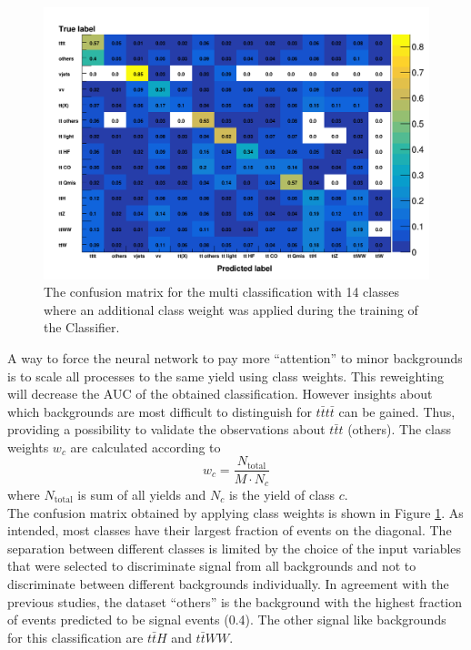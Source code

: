 \begin{figure}[H]
\centering
\includegraphics[width=\linewidth]{figs/MultiClass/Cm_classweights}
\caption{The confusion matrix for the multi classification with 14 classes where an additional class weight was applied during the training of the Classifier.}
\label{fig:CMWed}
\end{figure}

A way to force the neural network to pay more ``attention'' to minor backgrounds is to scale all processes to the same yield using class weights. This reweighting will decrease the AUC of the obtained classification. However insights about which backgrounds are most difficult to distinguish for $t\bar{t}t\bar{t}$ can be gained. Thus, providing a possibility to validate the observations about $t\bar{t}t$ (others). The class weights $w_{c}$ are calculated according to
\begin{equation}
w_{c} = \frac{N_{\text{total}} }{M \cdot N_{c}}
\end{equation}
where $N_{\text{total}}$ is sum of all yields and $N_{c}$ is the yield of class $c$. \\
The confusion matrix obtained by applying class weights is shown in Figure \ref{fig:CMWed}. As intended, most classes have their largest fraction of events on the diagonal. The separation between different classes is limited by the choice of the input variables that were selected to discriminate signal from all backgrounds and not to discriminate between different backgrounds individually. In agreement with the previous studies, the dataset ``others'' is the background with the highest fraction of events predicted to be signal events (0.4). The other signal like backgrounds for this classification are $t\bar{t}H$ and $t\bar{t}WW$.

